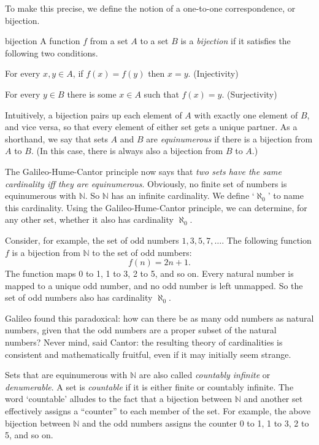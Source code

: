 To make this precise, we define the notion of a one-to-one correspondence, or bijection.

\begin{definition}{}{bijection}
  A function $f$ from a set $A$ to a set $B$ is a \emph{bijection}
  if it satisfies the following two conditions.
  \begin{cenumerate}
    \item[(i)] For every $x, y \in A$, if $f(x) = f(y)$ then $x = y$. (Injectivity)
    \item[(ii)] For every $y \in B$ there is some $x \in A$ such that $f(x) = y$. (Surjectivity)
  \end{cenumerate}
\end{definition}

Intuitively, a bijection pairs up each element of $A$ with exactly one element of $B$,
and vice versa,
so that every element of either set gets a unique partner.
As a shorthand,
we say that sets $A$ and $B$ are \emph{equinumerous} if there is a bijection from $A$ to $B$.
(In this case, there is always also a bijection from $B$ to $A$.)

The Galileo-Hume-Cantor principle now says that
\emph{two sets have the same cardinality iff they are equinumerous}.
Obviously,
no finite set of numbers is equinumerous with $\mathbb{N}$.
So $\mathbb{N}$ has an infinite cardinality.
We define `$\aleph_0$' to name this cardinality.
Using the Galileo-Hume-Cantor principle,
we can determine,
for any other set,
whether it also has cardinality $\aleph_0$.

Consider,
for example,
the set of odd numbers $1, 3, 5, 7, \ldots$.
The following function $f$ is a bijection from $\mathbb{N}$ to the set of odd numbers:
\[
  f(n) = 2n + 1.
\]
The function maps 0 to 1, 1 to 3, 2 to 5, and so on.
Every natural number is mapped to a unique odd number,
and no odd number is left unmapped.
So the set of odd numbers also has cardinality $\aleph_0$.

Galileo found this paradoxical:
how can there be as many odd numbers as natural numbers,
given that the odd numbers are a proper subset of the natural numbers?
Never mind,
said Cantor:
the resulting theory of cardinalities is consistent and mathematically fruitful,
even if it may initially seem strange.

Sets that are equinumerous with $\mathbb{N}$ are also called \emph{countably infinite} or \emph{denumerable}.
A set is \emph{countable} if it is either finite or countably infinite.
The word `countable' alludes to the fact that
a bijection between $\mathbb{N}$ and another set
effectively assigns a ``counter'' to each member of the set.
For example,
the above bijection between $\mathbb{N}$ and the odd numbers
assigns the counter 0 to 1, 1 to 3, 2 to 5, and so on.

